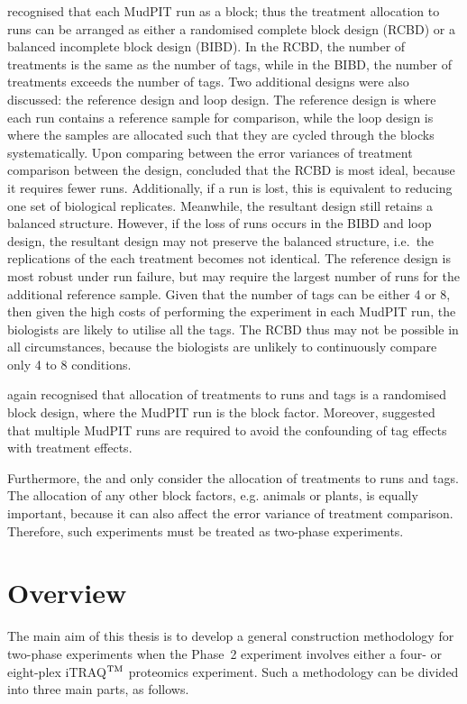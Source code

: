 \documentclass[11pt,a4paper]{article}
\begin{document}
\cite{Oberg2009} recognised that each MudPIT run as a block; thus the treatment allocation to runs can be arranged as either a randomised complete block design (RCBD) or a balanced incomplete block design (BIBD). In the RCBD, the number of treatments is the same as the number of tags, while in the BIBD, the number of treatments exceeds the number of tags. Two additional designs were also discussed: the reference design and loop design. The reference design is where each run contains a reference sample for comparison, while the loop design is where the samples are allocated such that they are cycled through the blocks systematically. Upon comparing between the error variances of treatment comparison between the design, \cite{Oberg2009} concluded that the RCBD is most ideal, because it requires fewer runs. Additionally, if a run is lost, this is equivalent to reducing one set of biological replicates. Meanwhile, the resultant design still retains a balanced structure. However, if the loss of runs occurs in the BIBD and loop design, the resultant design may not preserve the balanced structure, i.e.\ the replications of the each treatment becomes not identical. The reference design is most robust under run failure, but may require the largest number of runs for the additional reference sample. Given that the number of tags can be either 4 or 8, then given the high costs of performing the experiment in each MudPIT run, the biologists are likely to utilise all the tags. The RCBD thus may not be possible in all circumstances, because the biologists are unlikely to continuously compare only 4 to 8 conditions. 

\cite{Oberg2012} again recognised that allocation of treatments to runs and tags is a randomised block design, where the MudPIT run is the block factor. Moreover, \cite{Oberg2012} suggested that multiple MudPIT runs are required to avoid the confounding of tag effects with treatment effects.

Furthermore, the \cite{Oberg2009} and \cite{Oberg2012} only consider the allocation of treatments to runs and tags. The allocation of any other block factors, e.g. animals or plants, is equally important, because it can also affect the error variance of treatment comparison. Therefore, such experiments must be treated as two-phase experiments.  


\section{Overview}
\label{sec:overview}
The main aim of this thesis is to develop a general construction methodology for two-phase experiments when the Phase~2 experiment involves either a four- or eight-plex iTRAQ$^{\rm TM}$ proteomics experiment. Such a methodology can be divided into three main parts, as follows. 
\end{document}
